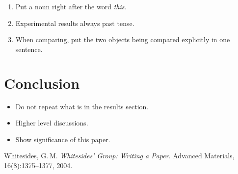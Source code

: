 \documentclass[%
 reprint,
 amsmath,amssymb,
 aps,
]{revtex4-1}
\begin{document}
\begin{enumerate}
    \item Put a noun right after the word \em{this}.
    \item Experimental results always past tense.
    \item When comparing, put the two objects being compared explicitly in one sentence.
\end{enumerate}



\section{\label{conclusion}Conclusion}

\begin{itemize}
    \item Do not repeat what is in the results section.
    \item Higher level discussions.
    \item Show significance of this paper.
\end{itemize}



\medskip

\begin{thebibliography}{9}
Whitesides, G. M.
\textit{Whitesides' Group: Writing a Paper}.
Advanced Materials, 16(8):1375--1377, 2004.
\end{thebibliography}
\end{document}
